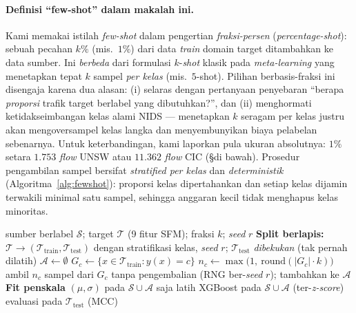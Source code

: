 \documentclass[11pt,a4paper]{article}
\begin{document}
\paragraph{Definisi ``few-shot'' dalam makalah ini.} Kami memakai istilah
\emph{few-shot} dalam pengertian \emph{fraksi-persen} (\emph{percentage-shot}):
sebuah pecahan $k\%$ (mis.\ $1\%$) dari data \emph{train} domain target
ditambahkan ke data sumber. Ini \emph{berbeda} dari formulasi $k$-\emph{shot}
klasik pada \emph{meta-learning} yang menetapkan tepat $k$ sampel \emph{per kelas}
(mis.\ $5$-shot). Pilihan berbasis-fraksi ini disengaja karena dua alasan: (i)
selaras dengan pertanyaan penyebaran ``berapa \emph{proporsi} trafik target
berlabel yang dibutuhkan?'', dan (ii) menghormati ketidakseimbangan kelas alami
NIDS --- menetapkan $k$ seragam per kelas justru akan mengoversampel kelas langka
dan menyembunyikan biaya pelabelan sebenarnya. Untuk keterbandingan, kami laporkan
pula ukuran absolutnya: $1\%$ setara $1{.}753$ \emph{flow} UNSW atau $11{.}362$
\emph{flow} CIC (\S di bawah). Prosedur pengambilan sampel bersifat
\emph{stratified per kelas} dan \emph{deterministik} (Algoritma~\ref{alg:fewshot}):
proporsi kelas dipertahankan dan setiap kelas dijamin terwakili minimal satu
sampel, sehingga anggaran kecil tidak menghapus kelas minoritas.

\begin{algorithm}[h]
\caption{Kalibrasi \emph{few-shot} lintas-jaringan (\emph{stratified},
anti-bocor, \emph{seeded})}
\label{alg:fewshot}
\begin{algorithmic}[1]
\Require sumber berlabel $\mathcal{S}$; target $\mathcal{T}$ (9 fitur SFM);
fraksi $k$; \emph{seed} $r$
\State \textbf{Split berlapis:} $\mathcal{T} \to (\mathcal{T}_{\text{train}},
\mathcal{T}_{\text{test}})$ dengan stratifikasi kelas, \emph{seed} $r$;
$\mathcal{T}_{\text{test}}$ \emph{dibekukan} (tak pernah dilatih)
\State $\mathcal{A} \gets \emptyset$ 
  \State $G_c \gets \{x \in \mathcal{T}_{\text{train}} : y(x)=c\}$
  \State $n_c \gets \max\!\bigl(1,\ \mathrm{round}(|G_c|\cdot k)\bigr)$
  \State ambil $n_c$ sampel dari $G_c$ tanpa pengembalian (RNG ber-\emph{seed} $r$);
  tambahkan ke $\mathcal{A}$
\EndFor
\State \textbf{Fit penskala} $(\mu,\sigma)$ pada $\mathcal{S}\cup\mathcal{A}$ saja
\State latih XGBoost pada $\mathcal{S}\cup\mathcal{A}$ (ter-\emph{z-score})
\State \Return evaluasi pada $\mathcal{T}_{\text{test}}$ (MCC)
\end{algorithmic}
\end{algorithm}
\end{document}
